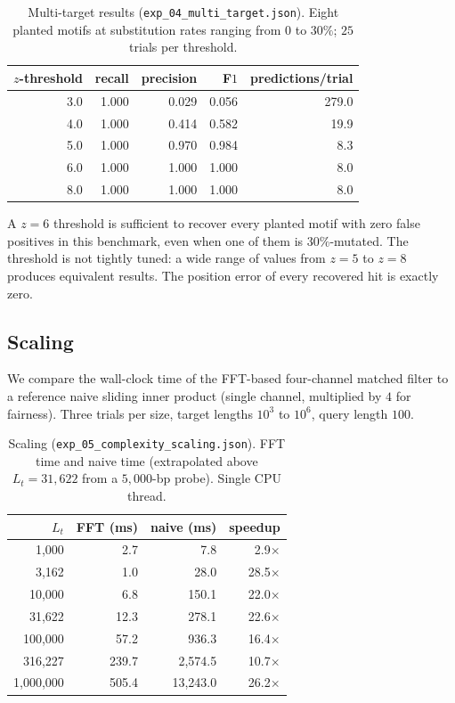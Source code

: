 \documentclass[twocolumn,11pt,a4paper]{article}
\theoremstyle{definition}
\theoremstyle{remark}
\begin{document}
\begin{table}[t]
  \centering\small
  \caption{Multi-target results (\texttt{exp\_04\_multi\_target.json}).
  Eight planted motifs at substitution rates ranging from $0$ to
  $30\%$; $25$ trials per threshold.}
  \label{tab:multi}
  \begin{tabular}{r | r r r r}
    \toprule
    $z$-threshold & recall & precision & F$1$ & predictions/trial \\
    \midrule
    3.0 & 1.000 & 0.029 & 0.056 & 279.0 \\
    4.0 & 1.000 & 0.414 & 0.582 & \phantom{0}19.9 \\
    5.0 & 1.000 & 0.970 & 0.984 & \phantom{00}8.3 \\
    6.0 & 1.000 & 1.000 & 1.000 & \phantom{00}8.0 \\
    8.0 & 1.000 & 1.000 & 1.000 & \phantom{00}8.0 \\
    \bottomrule
  \end{tabular}
\end{table}

A $z = 6$ threshold is sufficient to recover every planted motif with
zero false positives in this benchmark, even when one of them is
$30\%$-mutated. The threshold is not tightly tuned: a wide range of
values from $z = 5$ to $z = 8$ produces equivalent results. The
position error of every recovered hit is exactly zero.

\subsection{Scaling}
\label{sec:exp:scaling}

We compare the wall-clock time of the FFT-based four-channel matched
filter to a reference naive sliding inner product (single channel,
multiplied by $4$ for fairness). Three trials per size, target lengths
$10^3$ to $10^6$, query length $100$.



\begin{table}[t]
  \centering\small
  \caption{Scaling (\texttt{exp\_05\_complexity\_scaling.json}). FFT
  time and naive time (extrapolated above $L_t = 31{,}622$ from a
  $5{,}000$-bp probe). Single CPU thread.}
  \label{tab:scaling}
  \begin{tabular}{r | r r r}
    \toprule
    $L_t$ & FFT (ms) & naive (ms) & speedup \\
    \midrule
    1{,}000     & 2.7 & 7.8 & 2.9$\times$ \\
    3{,}162     & 1.0 & 28.0 & 28.5$\times$ \\
    10{,}000    & 6.8 & 150.1 & 22.0$\times$ \\
    31{,}622    & 12.3 & 278.1 & 22.6$\times$ \\
    100{,}000   & 57.2 & 936.3 & 16.4$\times$ \\
    316{,}227   & 239.7 & 2{,}574.5 & 10.7$\times$ \\
    1{,}000{,}000 & 505.4 & 13{,}243.0 & 26.2$\times$ \\
    \bottomrule
  \end{tabular}
\end{table}
\end{document}
